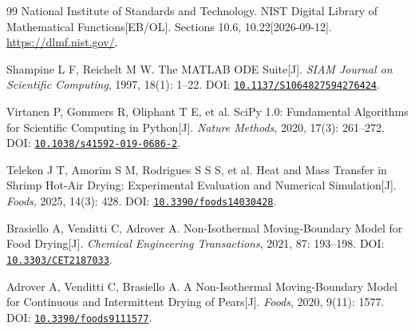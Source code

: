 \begin{thebibliography}{99}
\setlength{\itemsep}{0.45em}
\setlength{\parsep}{0pt}
National Institute of Standards and Technology. NIST Digital Library of Mathematical Functions[EB/OL]. Sections 10.6, 10.22[2026-09-12]. \url{https://dlmf.nist.gov/}.

Shampine L F, Reichelt M W. The MATLAB ODE Suite[J]. \textit{SIAM Journal on Scientific Computing}, 1997, 18(1): 1--22. DOI: \href{https://doi.org/10.1137/S1064827594276424}{\nolinkurl{10.1137/S1064827594276424}}.

Virtanen P, Gommers R, Oliphant T E, et al. SciPy 1.0: Fundamental Algorithms for Scientific Computing in Python[J]. \textit{Nature Methods}, 2020, 17(3): 261--272. DOI: \href{https://doi.org/10.1038/s41592-019-0686-2}{\nolinkurl{10.1038/s41592-019-0686-2}}.

Teleken J T, Amorim S M, Rodrigues S S S, et al. Heat and Mass Transfer in Shrimp Hot-Air Drying: Experimental Evaluation and Numerical Simulation[J]. \textit{Foods}, 2025, 14(3): 428. DOI: \href{https://doi.org/10.3390/foods14030428}{\nolinkurl{10.3390/foods14030428}}.

Brasiello A, Venditti C, Adrover A. Non-Isothermal Moving-Boundary Model for Food Drying[J]. \textit{Chemical Engineering Transactions}, 2021, 87: 193--198. DOI: \href{https://doi.org/10.3303/CET2187033}{\nolinkurl{10.3303/CET2187033}}.

Adrover A, Venditti C, Brasiello A. A Non-Isothermal Moving-Boundary Model for Continuous and Intermittent Drying of Pears[J]. \textit{Foods}, 2020, 9(11): 1577. DOI: \href{https://doi.org/10.3390/foods9111577}{\nolinkurl{10.3390/foods9111577}}.
\end{thebibliography}
